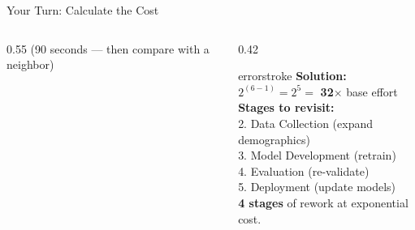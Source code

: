 \documentclass[aspectratio=169, 12pt]{beamer}
\begin{document}
\begin{frame}{Your Turn: Calculate the Cost}
\begin{columns}[T]
\begin{column}{0.55\textwidth}
    {\footnotesize\textcolor{midgray}{(90 seconds --- then compare with a neighbor)}}
  \end{column}
  \begin{column}{0.42\textwidth}
    \pause
    \begin{mlsyscard}{errorstroke}
    \textbf{Solution:}\\[0.1cm]
    {\footnotesize
    $2^{(6-1)} = 2^5 = $ \textbf{32$\times$} base effort\\[0.1cm]
    \textbf{Stages to revisit:}\\
    2. Data Collection (expand demographics)\\
    3. Model Development (retrain)\\
    4. Evaluation (re-validate)\\
    5. Deployment (update models)\\[0.1cm]
    \textcolor{errorstroke}{\textbf{4 stages}} of rework at exponential cost.}
    \end{mlsyscard}
  \end{column}
\end{columns}

\end{frame}
\end{document}
